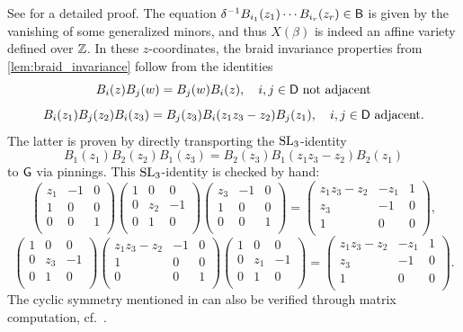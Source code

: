 \noindent See \cite[Corollary 3.7]{CGGLSS25} for a detailed proof. The equation $\delta^{-1}B_{i_{1}}(z_1)\cdots B_{i_{r}}(z_r) \in \mathsf{B}$ is given by the vanishing of some generalized minors, and thus $X(\beta)$ is indeed an affine variety defined over $\mathbb{Z}$. In these $z$-coordinates, the braid invariance properties from \cref{lem:braid_invariance} follow from the identities
$$B_{i}(z)B_{j}(w) = B_{j}(w)B_{i}(z),\quad i,j\in\mathsf{D}\mbox{ not adjacent}$$
$$B_{i}(z_1)B_{j}(z_2)B_{i}(z_3) = B_j(z_3)B_i(z_1z_3 - z_2)B_j(z_1),\quad i,j\in\mathsf{D}\mbox{ adjacent}.$$
The latter is proven by directly transporting the $\operatorname{SL}_3$-identity
$$B_{1}(z_1)B_{2}(z_2)B_{1}(z_3) = B_2(z_3)B_1(z_1z_3 - z_2)B_2(z_1)$$
to $\mathsf{G}$ via pinnings. This $\operatorname{SL}_3$-identity is checked by hand:
$$\begin{pmatrix}
z_1 & -1 & 0\\
1 & 0 & 0\\
0 & 0 & 1\\
\end{pmatrix}
\begin{pmatrix}
1 & 0 & 0\\
0 & z_2 & -1\\
0 & 1 & 0\\
\end{pmatrix}
\begin{pmatrix}
z_3 & -1 & 0\\
1 & 0 & 0\\
0 & 0 & 1\\
\end{pmatrix}=\begin{pmatrix}
z_1z_3-z_2 & -z_1 & 1\\
z_3 & -1 & 0\\
1 & 0 & 0\\
\end{pmatrix},$$
$$\begin{pmatrix}
1 & 0 & 0\\
0 & z_3 & -1\\
0 & 1 & 0\\
\end{pmatrix}
\begin{pmatrix}
z_1z_3-z_2 & -1 & 0\\
1 & 0 & 0\\
0 & 0 & 1\\
\end{pmatrix}
\begin{pmatrix}
1 & 0 & 0\\
0 & z_1 & -1\\
0 & 1 & 0\\
\end{pmatrix}=\begin{pmatrix}
z_1z_3-z_2 & -z_1 & 1\\
z_3 & -1 & 0\\
1 & 0 & 0\\
\end{pmatrix}.
$$
\normalsize
\noindent The cyclic symmetry mentioned in  can also be verified through matrix computation, cf.~\cite[Lemma 3.10]{CGGLSS25}.


